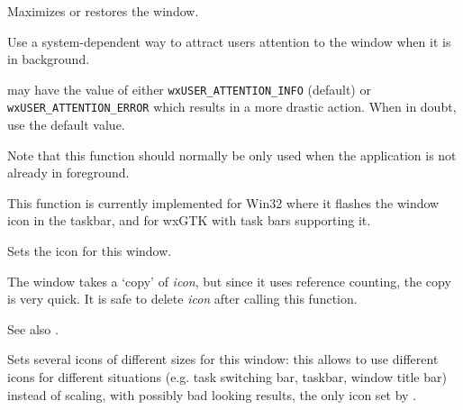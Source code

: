 
Maximizes or restores the window.






\label{wxtoplevelwindowrequestuserattention}


Use a system-dependent way to attract users attention to the window when it is
in background.

 may have the value of either \texttt{wxUSER\_ATTENTION\_INFO}
(default) or \texttt{wxUSER\_ATTENTION\_ERROR} which results in a more drastic
action. When in doubt, use the default value.

Note that this function should normally be only used when the application is
not already in foreground.

This function is currently implemented for Win32 where it flashes the
window icon in the taskbar, and for wxGTK with task bars supporting it.


\label{wxtoplevelwindowseticon}


Sets the icon for this window.




The window takes a `copy' of {\it icon}, but since it uses reference
counting, the copy is very quick. It is safe to delete {\it icon} after
calling this function.

See also .


\label{wxtoplevelwindowseticons}


Sets several icons of different sizes for this window: this allows to use
different icons for different situations (e.g. task switching bar, taskbar,
window title bar) instead of scaling, with possibly bad looking results, the
only icon set by .

